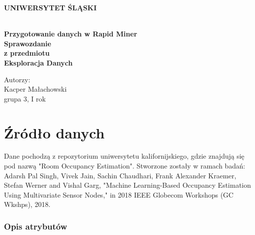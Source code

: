 \documentclass[12pt,oneside,a4paper]{book} %
\theoremstyle{break}
\begin{document}
\thispagestyle{empty}
\begin{center}
  \Large
  \bf{UNIWERSYTET ŚLĄSKI}\\
  \bf{}\\[25mm]
  \large

  \bf{Przygotowanie danych w Rapid Miner}\\[35mm]

  Sprawozdanie\\
  z przedmiotu\\
  Eksploracja Danych\\[25mm]
\end{center}
\begin{flushright}
  \large
  Autorzy:\\
  Kacper Małachowski\\
  grupa 3, I rok\\[25mm]
\end{flushright}

\chapter*{Źródło danych}

Dane pochodzą z repozytorium uniwersytetu kalifornijskiego, gdzie znajdują się pod nazwą "Room Occupancy Estimation".
Stworzone zostały w ramach badań: Adarsh Pal Singh, Vivek Jain, Sachin Chaudhari, Frank Alexander Kraemer, Stefan Werner and Vishal Garg, "Machine Learning-Based Occupancy Estimation Using Multivariate Sensor Nodes," in 2018 IEEE Globecom Workshops (GC Wkshps), 2018.

\subsection*{Opis atrybutów}
\end{document}
